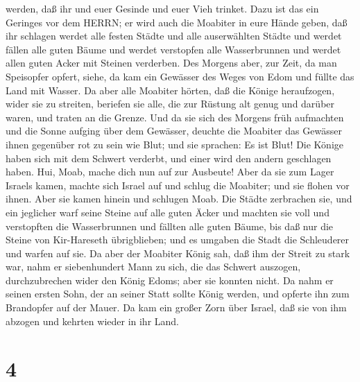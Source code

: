 werden, daß ihr und euer Gesinde und euer Vieh trinket. 
Dazu ist das ein Geringes vor dem HERRN; er wird auch die Moabiter in
eure Hände geben,  daß ihr schlagen werdet alle festen
Städte und alle auserwählten Städte und werdet fällen alle guten Bäume
und werdet verstopfen alle Wasserbrunnen und werdet allen guten Acker
mit Steinen verderben.  Des Morgens aber, zur Zeit, da man
Speisopfer opfert, siehe, da kam ein Gewässer des Weges von Edom und
füllte das Land mit Wasser.  Da aber alle Moabiter hörten,
daß die Könige heraufzogen, wider sie zu streiten, beriefen sie alle,
die zur Rüstung alt genug und darüber waren, und traten an die Grenze.
 Und da sie sich des Morgens früh aufmachten und die Sonne
aufging über dem Gewässer, deuchte die Moabiter das Gewässer ihnen
gegenüber rot zu sein wie Blut;  und sie sprachen: Es ist
Blut! Die Könige haben sich mit dem Schwert verderbt, und einer wird den
andern geschlagen haben. Hui, Moab, mache dich nun auf zur Ausbeute!
 Aber da sie zum Lager Israels kamen, machte sich Israel
auf und schlug die Moabiter; und sie flohen vor ihnen. Aber sie kamen
hinein und schlugen Moab.  Die Städte zerbrachen sie, und
ein jeglicher warf seine Steine auf alle guten Äcker und machten sie
voll und verstopften die Wasserbrunnen und fällten alle guten Bäume, bis
daß nur die Steine von Kir-Hareseth übrigblieben; und es umgaben die
Stadt die Schleuderer und warfen auf sie.  Da aber der
Moabiter König sah, daß ihm der Streit zu stark war, nahm er
siebenhundert Mann zu sich, die das Schwert auszogen, durchzubrechen
wider den König Edoms; aber sie konnten nicht.  Da nahm er
seinen ersten Sohn, der an seiner Statt sollte König werden, und opferte
ihn zum Brandopfer auf der Mauer. Da kam ein großer Zorn über Israel,
daß sie von ihm abzogen und kehrten wieder in ihr Land.

\hypertarget{section-3}{%
\section{4}\label{section-3}}

